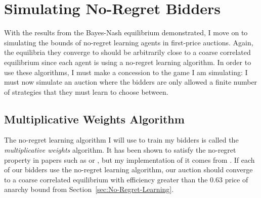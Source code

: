 \documentclass[12pt,twoside]{reedthesis}
\begin{document}
\section{Simulating No-Regret Bidders}
With the results from the Bayes-Nash equilibrium demonstrated, I move on to simulating the bounds of no-regret learning agents in first-price auctions. Again, the equilibria they converge to should be arbitrarily close to a coarse correlated equilibrium since each agent is using a no-regret learning algorithm. In order to use these algorithms, I must make a concession to the game I am simulating: I must now simulate an auction where the bidders are only allowed a finite number of strategies that they must learn to choose between.

\subsection{Multiplicative Weights Algorithm}
The no-regret learning algorithm I will use to train my bidders is called the {\em multiplicative weights} algorithm. It has been shown to satisfy the no-regret property in papers such as \citet{Littlestone1994} or \citet{Freund1999}, but my implementation of it comes from \cite{Roughgarden2016}. If each of our bidders use the no-regret learning algorithm, our auction should converge to a coarse correlated equilibrium with efficiency greater than the $0.63$ price of anarchy bound from Section~\ref{sec:No-Regret-Learning}. 
\end{document}
